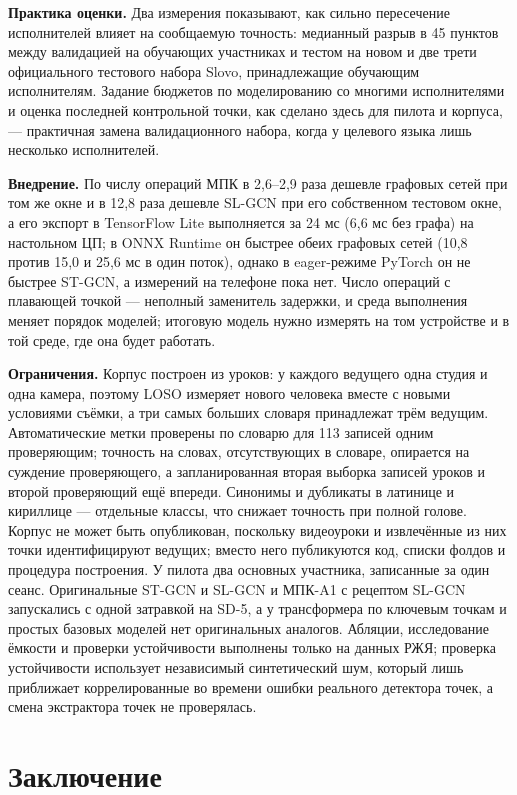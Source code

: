 \textbf{Практика оценки.} Два измерения показывают, как сильно пересечение исполнителей влияет на сообщаемую точность: медианный разрыв в 45 пунктов между валидацией на обучающих участниках и тестом на новом и две трети официального тестового набора Slovo, принадлежащие обучающим исполнителям. Задание бюджетов по моделированию со многими исполнителями и оценка последней контрольной точки, как сделано здесь для пилота и корпуса, --- практичная замена валидационного набора, когда у целевого языка лишь несколько исполнителей.

\textbf{Внедрение.} По числу операций МПК в 2,6--2,9 раза дешевле графовых сетей при том же окне и в 12,8 раза дешевле SL-GCN при его собственном тестовом окне, а его экспорт в TensorFlow Lite выполняется за 24 мс (6,6 мс без графа) на настольном ЦП; в ONNX Runtime он быстрее обеих графовых сетей (10,8 против 15,0 и 25,6 мс в один поток), однако в eager-режиме PyTorch он не быстрее ST-GCN, а измерений на телефоне пока нет. Число операций с плавающей точкой --- неполный заменитель задержки, и среда выполнения меняет порядок моделей; итоговую модель нужно измерять на том устройстве и в той среде, где она будет работать.

\textbf{Ограничения.} Корпус построен из уроков: у каждого ведущего одна студия и одна камера, поэтому LOSO измеряет нового человека вместе с новыми условиями съёмки, а три самых больших словаря принадлежат трём ведущим. Автоматические метки проверены по словарю для 113 записей одним проверяющим; точность на словах, отсутствующих в словаре, опирается на суждение проверяющего, а запланированная вторая выборка записей уроков и второй проверяющий ещё впереди. Синонимы и дубликаты в латинице и кириллице --- отдельные классы, что снижает точность при полной голове. Корпус не может быть опубликован, поскольку видеоуроки и извлечённые из них точки идентифицируют ведущих; вместо него публикуются код, списки фолдов и процедура построения. У пилота два основных участника, записанные за один сеанс. Оригинальные ST-GCN и SL-GCN и МПК-A1 с рецептом SL-GCN запускались с одной затравкой на SD-5, а у трансформера по ключевым точкам и простых базовых моделей нет оригинальных аналогов. Абляции, исследование ёмкости и проверки устойчивости выполнены только на данных РЖЯ; проверка устойчивости использует независимый синтетический шум, который лишь приближает коррелированные во времени ошибки реального детектора точек, а смена экстрактора точек не проверялась.

\hypertarget{ux437ux430ux43aux43bux44eux447ux435ux43dux438ux435}{%
\section{Заключение}\label{ux437ux430ux43aux43bux44eux447ux435ux43dux438ux435}}

